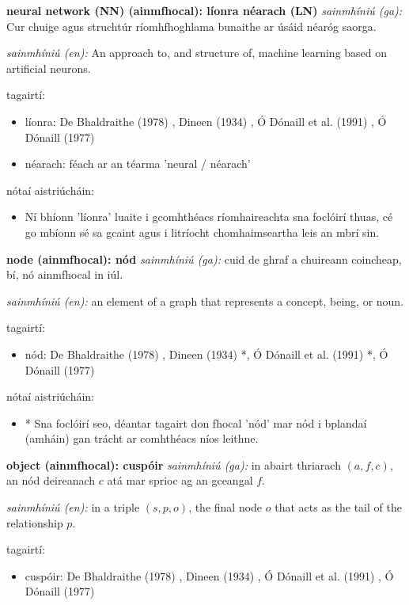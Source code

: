 \documentclass{article}
\begin{document}
\textbf{neural network (NN) (ainmfhocal): líonra néarach (LN)}
\textit{sainmhíniú (ga):} Cur chuige agus struchtúr ríomhfhoghlama bunaithe ar úsáid néaróg saorga.

\textit{sainmhíniú (en):} An approach to, and structure of, machine learning based on artificial neurons.

tagairtí:
\begin{itemize}
	\item líonra: De Bhaldraithe (1978) \cite{de-bhaldraithe}, Dineen (1934) \cite{dineen}, Ó Dónaill et al. (1991) \cite{focloir-beag}, Ó Dónaill (1977) \cite{odonaill}
	\item néarach: féach ar an téarma 'neural / néarach'
\end{itemize}

nótaí aistriúcháin:
\begin{itemize}
	\item Ní bhíonn 'líonra' luaite i gcomhthéacs ríomhaireachta sna foclóirí thuas, cé go mbíonn sé sa gcaint agus i litríocht chomhaimseartha leis an mbrí sin.
\end{itemize}


\textbf{node (ainmfhocal): nód}
\textit{sainmhíniú (ga):} cuid de ghraf a chuireann coincheap, bí, nó ainmfhocal in iúl.

\textit{sainmhíniú (en):} an element of a graph that represents a concept, being, or noun.

tagairtí:
\begin{itemize}
	\item nód: De Bhaldraithe (1978) \cite{de-bhaldraithe}, Dineen (1934) \cite{dineen}*, Ó Dónaill et al. (1991) \cite{focloir-beag}*, Ó Dónaill (1977) \cite{odonaill}
\end{itemize}

nótaí aistriúcháin:
\begin{itemize}
	\item * Sna foclóirí seo, déantar tagairt don fhocal 'nód' mar nód i bplandaí (amháin) gan trácht ar comhthéacs níos leithne.
\end{itemize}


\textbf{object (ainmfhocal): cuspóir}
\textit{sainmhíniú (ga):} in abairt thriarach $(a,f,c)$, an nód deireanach $c$ atá mar sprioc ag an gceangal $f$.

\textit{sainmhíniú (en):} in a triple $(s,p,o)$, the final node $o$ that acts as the tail of the relationship $p$.

tagairtí:
\begin{itemize}
	\item cuspóir: De Bhaldraithe (1978) \cite{de-bhaldraithe}, Dineen (1934) \cite{dineen}, Ó Dónaill et al. (1991) \cite{focloir-beag}, Ó Dónaill (1977) \cite{odonaill}
\end{itemize}
\end{document}
